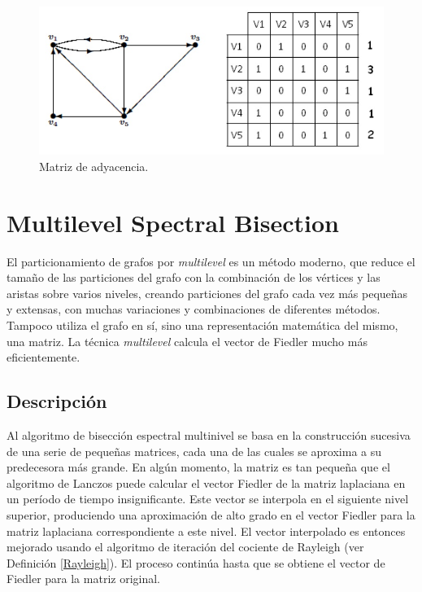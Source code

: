 \begin{figure}[h]
	\centering
	\includegraphics[scale=0.45]{Figures/matriz}
	\vspace{1mm}
	\caption{Matriz de adyacencia.}
	\label{matriz_adyacencia}
\end{figure}

\section{Multilevel Spectral Bisection}\label{Multilevel-Spectral-Bisection}

El particionamiento de grafos por \textit{multilevel} es un método moderno, que reduce el tamaño de las particiones del grafo con la combinación de los vértices y las aristas sobre varios niveles, creando particiones del grafo cada vez más pequeñas y extensas, con muchas variaciones y combinaciones de diferentes métodos. Tampoco utiliza el grafo en sí, sino una representación matemática del mismo, una matriz. La técnica \textit{multilevel} calcula el vector de Fiedler\cite{Fiedler} mucho más eficientemente.

\subsection{Descripción}\label{msb_description}

Al algoritmo de bisección espectral multinivel se basa en la construcción sucesiva de una serie de pequeñas matrices, cada una de las cuales se aproxima a su predecesora más grande. En algún momento, la matriz es tan pequeña que el algoritmo de Lanczos\cite{Lanczos} puede calcular el vector Fiedler\cite{Fiedler} de la matriz laplaciana en un período de tiempo insignificante. Este vector se interpola en el siguiente nivel superior, produciendo una aproximación de alto grado en el vector Fiedler para la matriz laplaciana correspondiente a este nivel. El vector interpolado es entonces mejorado usando el algoritmo de iteración del cociente de Rayleigh (ver Definición \ref{Rayleigh}). El proceso continúa hasta que se obtiene el vector de Fiedler para la matriz original.


